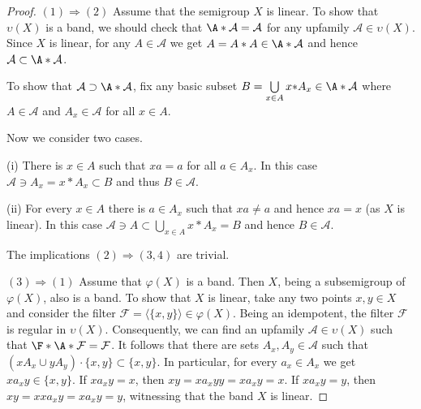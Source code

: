 \documentclass{amsart}
\theoremstyle{definition}
\begin{document}
\begin{proof} $(1){\Rightarrow}(2)$ Assume that the semigroup $X$ is linear. To show that ${\upsilon}(X)$ is a band, we should check that $\A*{\mathcal A}={\mathcal A}$ for any upfamily  ${\mathcal A}\in\upsilon(X)$. Since $X$ is linear, for any $A\in{\mathcal A}$ we get $A=A*A\in\A*{\mathcal A}$ and hence ${\mathcal A}\subset\A*{\mathcal A}$.

To show that ${\mathcal A}\supset\A*{\mathcal A}$, fix any basic subset $B=\bigcup\limits_{x\in A}x{*}A_x\in\A*{\mathcal A}$ where $A\in{\mathcal A}$ and $A_x\in{\mathcal A}$ for all $x\in A$.

Now we consider two cases.

(i) There is $x\in A$ such that $xa=a$ for all $a\in A_x$. In this case ${\mathcal A}\ni A_x=x{*}A_x\subset B$ and thus $B\in{\mathcal A}$.

(ii) For every $x\in A$ there is $a\in A_x$ such that $xa\ne a$ and hence $xa=x$ (as $X$ is linear). In this case ${\mathcal A}\ni A\subset\bigcup_{x\in A}x*A_x=B$ and hence $B\in{\mathcal A}$.
\smallskip

The implications $(2){\Rightarrow}(3,4)$ are trivial.
\smallskip

$(3){\Rightarrow}(1)$ Assume that $\varphi(X)$ is a band. Then $X$, being a subsemigroup of $\varphi(X)$, also is a band. To show that $X$ is linear, take any two points $x,y\in X$ and consider the filter ${\mathcal {F}}={\langle}\{x,y\}{\rangle}\in\varphi(X)$. Being an idempotent, the filter ${\mathcal {F}}$ is regular in ${\upsilon}(X)$. Consequently, we can find an upfamily ${\mathcal A}\in\upsilon(X)$ such that $\F*\A*{\mathcal {F}}={\mathcal {F}}$. It follows that there are sets $A_x,A_y\in{\mathcal A}$ such that $(xA_x\cup yA_y)\cdot\{x,y\}\subset\{x,y\}$. In particular, for every $a_x\in A_x$ we get $xa_xy\in\{x,y\}$. If $xa_xy=x$, then $xy=xa_xyy=xa_xy=x$. If $xa_xy=y$, then $xy=xxa_xy=xa_xy=y$, witnessing that the band $X$ is linear.


\end{proof}
\end{document}
